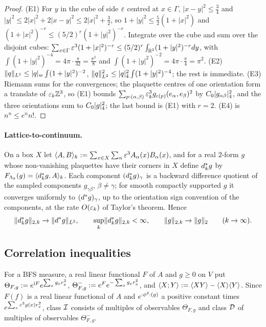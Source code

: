 \begin{proof}
(E1) For $y$ in the cube of side $\varepsilon$ centred at $x\in\Gamma$, $|x-y|^2\le\frac34$ and $|y|^2\le2|x|^2+2|x-y|^2\le2|x|^2+\frac32$, so $1+|y|^2\le\frac52(1+|x|^2)$ and $(1+|x|^2)^{-r}\le(5/2)^r(1+|y|^2)^{-r}$. Integrate over the cube and sum over the disjoint cubes: $\sum_{x\in\Gamma}\varepsilon^3(1+|x|^2)^{-r}\le(5/2)^r\int_{\mathbb R^3}(1+|y|^2)^{-r}dy$, with $\int(1+|y|^2)^{-4}=4\pi\cdot\frac\pi{32}=\frac{\pi^2}8$ and $\int(1+|y|^2)^{-2}=4\pi\cdot\frac\pi4=\pi^2$. (E2) $\lVert q\rVert_{L^1}\le\lvert q\rvert_{w}\int(1+|y|^2)^{-2}$, $\lVert q\rVert_{L^2}^2\le\lvert q\rvert_{4}^2\int(1+|y|^2)^{-4}$; the rest is immediate. (E3) Riemann sums for the convergences; the plaquette centres of one orientation form a translate of $\varepsilon_k\mathbb Z^3$, so (E1) bounds $\sum_{p:(\alpha,\beta)}\varepsilon_k^3g_{c(p)}(e_\alpha,e_\beta)^2$ by $C_0\lvert g_{\alpha\beta}\rvert_{4}^2$, and the three orientations sum to $C_0\lvert g\rvert_{4}^2$; the last bound is (E1) with $r=2$. (E4) is $n^n\le e^nn!$.
\end{proof}

\paragraph{Lattice-to-continuum.} On a box $X$ let $\langle A,B\rangle_k:=\sum_{x\in X}\sum_\alpha\varepsilon^3A_\alpha(x)B_\alpha(x)$, and for a real $2$-form $g$ whose non-vanishing plaquettes have their corners in $X$ define $d^{*}_kg$ by $F_{\Lambda_k}(g)=\langle d^{*}_kg,A\rangle_k$. Each component $(d^{*}_kg)_\gamma$ is a backward difference quotient of the sampled components $g_{\gamma\beta}$, $\beta\ne\gamma$; for smooth compactly supported $g$ it converges uniformly to $(d^{*} g)_\gamma$, up to the orientation sign convention of the components, at the rate $O(\varepsilon_k)$ of Taylor's theorem. Hence
\begin{equation}\label{eq:s02:riemann}
\lVert d^{*}_kg\rVert_{2,k}\to\lVert d^{*} g\rVert_{L^2},\qquad \sup_k\lVert d^{*}_kg\rVert_{2,k}<\infty,\qquad \lVert g\rVert_{2,k}\to\lVert g\rVert_2\qquad(k\to\infty).
\end{equation}

\subsection{Correlation inequalities}

For a BFS measure, a real linear functional $F$ of $A$ and $g\ge0$ on $V$ put $\Theta_{F,g}:= e^{\mathrm iF}e^{\sum_xg_xr_x^2}$, $\Theta^-_{F,g}:= e^{F}e^{-\sum_xg_xr_x^2}$, and $\langle X;Y\rangle:=\langle XY\rangle-\langle X\rangle\langle Y\rangle$. Since $F(f)$ is a real linear functional of $A$ and $e^{{:}\phi^2{:}(g)}$ a positive constant times $e^{\sum_x\varepsilon^3g(x)r_x^2}$, class $\mathcal I$ consists of multiples of observables $\Theta_{F,g}$ and class $\mathcal D$ of multiples of observables $\Theta^-_{F,g}$.


